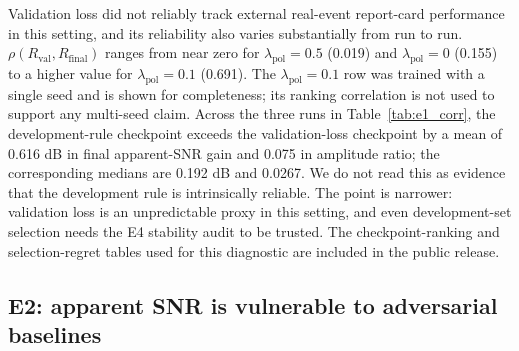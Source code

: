 \documentclass[review,12pt,authoryear]{elsarticle}
\newcommand{\lpol}{\lambda_{\mathrm{pol}}}
\begin{document}
\begin{table}[!htbp]
\centering
\caption{E1 real-event final-set ranking correlations and validation-selection regret. This diagnostic uses external real-event final-set summaries rather than the evaluator-held pseudo-clean controlled-mixture target, so the no-taper target-definition audit does not change these values.}
\label{tab:e1_corr}
\small
\resizebox{\linewidth}{!}{%
}
\end{table}

Validation loss did not reliably track external real-event report-card performance in this setting, and its reliability also varies substantially from run to run. $\rho(R_{\mathrm{val}},R_{\mathrm{final}})$ ranges from near zero for $\lpol=0.5$ (0.019) and $\lpol=0$ (0.155) to a higher value for $\lpol=0.1$ (0.691). The $\lpol=0.1$ row was trained with a single seed and is shown for completeness; its ranking correlation is not used to support any multi-seed claim. Across the three runs in Table~\ref{tab:e1_corr}, the development-rule checkpoint exceeds the validation-loss checkpoint by a mean of 0.616 dB in final apparent-SNR gain and 0.075 in amplitude ratio; the corresponding medians are 0.192 dB and 0.0267. We do not read this as evidence that the development rule is intrinsically reliable. The point is narrower: validation loss is an unpredictable proxy in this setting, and even development-set selection needs the E4 stability audit to be trusted. The checkpoint-ranking and selection-regret tables used for this diagnostic are included in the public release.

\subsection{E2: apparent SNR is vulnerable to adversarial baselines}
\label{sec:e2}
\end{document}
